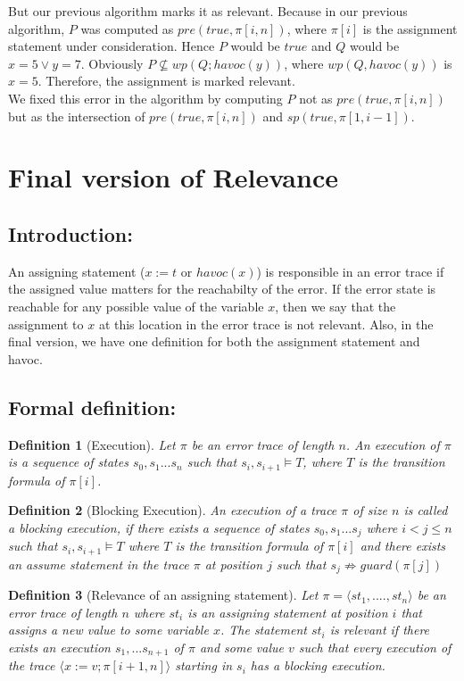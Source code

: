 \documentclass{article}
\newcommand{\limp}{\Rightarrow}
\newtheorem{mydef}{Definition}
\begin{document}
But our previous algorithm marks it as relevant. Because in our previous algorithm, $P$ was computed as $pre(true, \pi[i,n])$, where $\pi[i]$ is the assignment statement under consideration. Hence $P$ would be $true$ and $Q$ would be $x=5 \vee y=7$. Obviously $P \not \subseteq wp(Q; havoc(y))$, where $wp(Q, havoc(y))$ is $x=5$. Therefore, the assignment is marked relevant. \\
We fixed this error in the algorithm by computing $P$ not as $pre(true, \pi[i,n])$ but as the intersection of $pre(true, \pi[i,n])$ and $sp(true, \pi[1,i-1])$.



\newpage
\section{Final version of Relevance}
\subsection{Introduction:}
An assigning statement ($x := t$ or $havoc(x)$) is responsible in an error trace if the assigned value matters for the reachabilty of the error. If the error state is reachable for any possible value of the variable $x$, then we say that the assignment to $x$ at this location in the error trace is not relevant. Also, in the final version, we have one definition for both the assignment statement and havoc. 
\subsection{Formal definition:}
\begin{mydef}[Execution]\label{mydef:execution}
Let $\pi$ be an error trace of length $n$. An execution of $\pi$ is a sequence of states $s_0, s_1 ... s_n$ such that $s_i, s_{i+1} \vDash T$, where $T$ is the transition formula of $\pi[i]$.
\end{mydef}
\begin{mydef}[Blocking Execution]\label{mydef:blocked_execution}
An execution of a trace $\pi$ of size $n$ is called a blocking execution, if there exists a sequence of states $s_0,s_1...s_j$ where $i<j \leq n$ such that $s_i, s_{i+1} \vDash T$ where $T$ is the transition formula of $\pi[i]$ and there exists an assume statement in the trace $\pi$ at position $j$ such that $s_j \not \limp guard(\pi[j])$
\end{mydef}

\begin{mydef}[Relevance of an assigning statement]\label{mydef:responsible}
Let $\pi = \langle st_1,....,st_n \rangle$ be an error trace of length $n$ where $st_i$ is an assigning statement at position $i$ that assigns a new value to some variable $x$. The statement $st_i$ is relevant if there exists an execution $s_1,...s_{n+1}$ of $\pi$ and some value $v$ such that every execution of the trace $\langle x:=v; \pi[i+1,n] \rangle$ starting in $s_i$ has a blocking execution.
\end{mydef}
\end{document}
